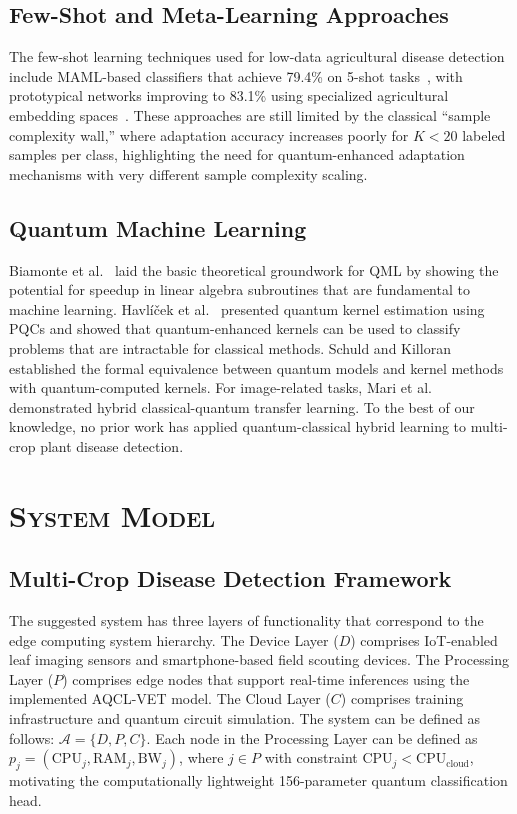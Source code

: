 \documentclass[conference]{IEEEtran}
\begin{document}
\subsection{Few-Shot and Meta-Learning Approaches}

The few-shot learning techniques used for low-data agricultural disease detection include MAML-based classifiers that achieve 79.4\% on 5-shot tasks~\cite{gao2023}, with prototypical networks improving to 83.1\% using specialized agricultural embedding spaces~\cite{patel2023}. These approaches are still limited by the classical ``sample complexity wall,'' where adaptation accuracy increases poorly for $K < 20$ labeled samples per class, highlighting the need for quantum-enhanced adaptation mechanisms with very different sample complexity scaling.

\subsection{Quantum Machine Learning}

Biamonte et al.~\cite{biamonte2017} laid the basic theoretical groundwork for QML by showing the potential for speedup in linear algebra subroutines that are fundamental to machine learning. Havl\'{i}\v{c}ek et al.~\cite{havlicek2019} presented quantum kernel estimation using PQCs and showed that quantum-enhanced kernels can be used to classify problems that are intractable for classical methods. Schuld and Killoran~\cite{schuld2019} established the formal equivalence between quantum models and kernel methods with quantum-computed kernels. For image-related tasks, Mari et al.~\cite{mari2020} demonstrated hybrid classical-quantum transfer learning. To the best of our knowledge, no prior work has applied quantum-classical hybrid learning to multi-crop plant disease detection.

\section{\textsc{System Model}}
\label{sec:system}

\subsection{Multi-Crop Disease Detection Framework}

The suggested system has three layers of functionality that correspond to the edge computing system hierarchy. The Device Layer ($D$) comprises IoT-enabled leaf imaging sensors and smartphone-based field scouting devices. The Processing Layer ($P$) comprises edge nodes that support real-time inferences using the implemented AQCL-VET model. The Cloud Layer ($C$) comprises training infrastructure and quantum circuit simulation. The system can be defined as follows: $\mathcal{A} = \{D, P, C\}$. Each node in the Processing Layer can be defined as $p_j = (\text{CPU}_j, \text{RAM}_j, \text{BW}_j)$, where $j \in P$ with constraint $\text{CPU}_j < \text{CPU}_\text{cloud}$, motivating the computationally lightweight 156-parameter quantum classification head.
\end{document}
